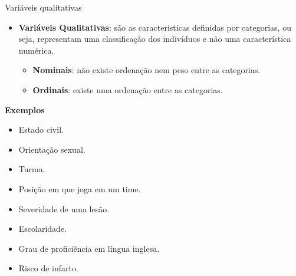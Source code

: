 \documentclass[
  ignorenonframetext,
  serif,
  professionalfont,
  usenames,
  dvipsnames,
  aspectratio = 169]{beamer}
\providecommand{\tightlist}{%
  \setlength{\itemsep}{0pt}\setlength{\parskip}{0pt}}
\renewcommand{\tightlist}{%
  \setlength{\itemsep}{0\baselineskip}
  \setlength{\parskip}{0.25\baselineskip}
}
\def\beginAHalfColumn{\begin{minipage}{0.49\textwidth}}%
\def\endColumns{\end{minipage}}%
\begin{document}
\begin{frame}{Variáveis qualitativas}
\label{variuxe1veis-qualitativas}
\beginAHalfColumn

\begin{itemize}
\tightlist
\item
  \textbf{Variáveis Qualitativas}: são as características definidas por
  categorias, ou seja, representam uma classificação dos indivíduos e
  não uma característica numérica.

  \begin{itemize}
  \tightlist
  \item
    \textbf{Nominais}: não existe ordenação nem peso entre as
    categorias.
  \item
    \textbf{Ordinais}: existe uma ordenação entre as categorias.
  \end{itemize}
\end{itemize}

\endColumns
\beginAHalfColumn

\textbf{Exemplos}

\begin{itemize}
\tightlist
\item
  Estado civil.
\item
  Orientação sexual.
\item
  Turma.
\item
  Posição em que joga em um time.
\item
  Severidade de uma lesão.
\item
  Escolaridade.
\item
  Grau de proficiência em língua inglesa.
\item
  Risco de infarto.
\end{itemize}

\endColumns
\end{frame}
\end{document}
